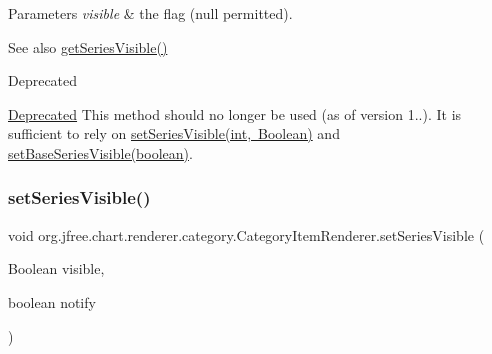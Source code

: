 \begin{DoxyParams}{Parameters}
{\em visible} & the flag ({\ttfamily null} permitted).\\
\hline
\end{DoxyParams}
\begin{DoxySeeAlso}{See also}
\mbox{\hyperlink{interfaceorg_1_1jfree_1_1chart_1_1renderer_1_1category_1_1_category_item_renderer_a0769a384dfe60163122348120d334ccf}{get\+Series\+Visible()}}
\end{DoxySeeAlso}
\begin{DoxyRefDesc}{Deprecated}
\item[\mbox{\hyperlink{deprecated__deprecated000154}{Deprecated}}]This method should no longer be used (as of version 1..). It is sufficient to rely on \mbox{\hyperlink{interfaceorg_1_1jfree_1_1chart_1_1renderer_1_1category_1_1_category_item_renderer_a929d5c0d5de37983ac3f83b31b3f2abe}{set\+Series\+Visible(int, Boolean)}} and \mbox{\hyperlink{interfaceorg_1_1jfree_1_1chart_1_1renderer_1_1category_1_1_category_item_renderer_a5f2b5280274a015095a855e988ae1fe1}{set\+Base\+Series\+Visible(boolean)}}. \end{DoxyRefDesc}
\mbox{\label{interfaceorg_1_1jfree_1_1chart_1_1renderer_1_1category_1_1_category_item_renderer_ae9bc13ad01ea7e703bd26ac346f737da}} 
\subsubsection{\texorpdfstring{set\+Series\+Visible()}{setSeriesVisible()}\hspace{0.1cm}{\footnotesize\ttfamily [2/4]}}
{\footnotesize\ttfamily void org.\+jfree.\+chart.\+renderer.\+category.\+Category\+Item\+Renderer.\+set\+Series\+Visible (\begin{DoxyParamCaption}\item[{Boolean}]{visible,  }\item[{boolean}]{notify }\end{DoxyParamCaption})}

